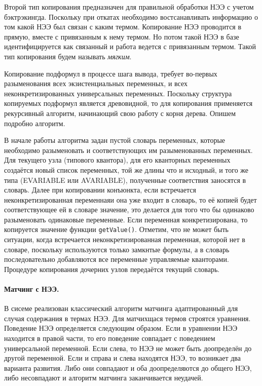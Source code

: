 Второй тип копирования предназначен для правильной обработки НЭЭ с учетом бэктрэкингда. Поскольку при откатах необходимо востсанавливать информацию о том какой НЭЭ был связан с каким термом. Копирование НЭЭ проводится в прямую, вместе с привязанным к нему термом. Но потом такой НЭЭ в базе идентифицируется как связанный и работа ведется с привязанным термом. Такой тип копирования будем называть \emph{мягким}.

Копирование подформул в процессе шага вывода, требует во-первых разыменования всех экзистенциальных переменных, и всех неконкретизированных универсальных переменных. Поскольку структура копируемых подформул является древовидной, то для копирования применяется рекурсивный алгоритм, начинающий свою работу с корня дерева. Опишем подробно алгоритм.

В начале работы алгоритма задан пустой словарь переменных, которые необходимо разыменовать и соответствующих им  разыменованных переменных. Для текущего узла (типового квантора), для его кванторных переменных создаётся новый список переменных, той же длины что и исходный, и того же типа (EVARIABLE или AVARIABLE), полученные соответствия заносятся в словарь. Далее при копировании конъюнкта, если встречается неконкретизированная переменнаяи она уже входит в словарь, то её копией будет соответствующее ей в словаре значение, это делается для того что бы одинаково разыменовать одинаковые переменные. Если переменная конкретизирована, то копируется значение функции {\tt getValue()}. Отметим, что не может быть ситуации, когда встречается неконкретизированная переменная, которой нет в словаре, поскольку используются только замкнтые формулы, а в словарь последовательно добавляются все переменные управляемые кванторами. Процедуре копирования дочерних узлов передаётся текущий словарь.

\paragraph{Матчинг с НЭЭ.} В сисеме реализован классический алгоритм матчинга адаптированный для случая содержания в термах НЭЭ. Для матчихщася термов строятся уравнения. Поведение НЭЭ определяется следующим образом. Если в уравнении НЭЭ находится в правой части, то его поведение совпадает с поведением универсальной переменной. Если слева, то НЭЭ не может быть доопределён до другой переменной. Если и справа и слева находятся НЭЭ, то возникает два варианта развития. Либо они совпадают и оба доопределяются до общего НЭЭ, либо несовпадают и алгоритм матчинга заканчивается неудачей.

